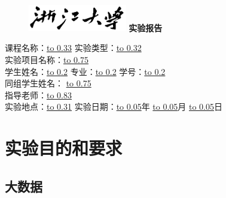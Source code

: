 \documentclass[UTF8,AutoFakeBold,a4paper]{article}%
\begin{document}
    \thispagestyle{empty}
    \begin{figure}[t]
        \centering
        \includegraphics[width=4.3cm]{figures/zju_subnote.png}
        \textbf{\bfseries\kaishu 实验报告}
    \end{figure}
    \parbox{0.9\linewidth}{
        \fangsong{}\linespread{1.5}
        课程名称：\underline{\hbox to 0.33\linewidth{\hfill 流体力学 \hfill}}
        实验类型：\underline{\hbox to 0.32\linewidth{\hfill 验证性 \hfill}} \\ 
        实验项目名称：\underline{\hbox to 0.75\linewidth{\hfill \hfill}} \\ 
        学生姓名：\underline{\hbox to 0.2\linewidth{\hfill \hfill}}
        专业：\underline{\hbox to 0.2\linewidth{\hfill \hfill}}
        学号：\underline{\hbox to 0.2\linewidth{\hfill \hfill}} \\ 
        同组学生姓名：	\underline{\hbox to 0.75\linewidth{\hfill \hfill}} \\ 		         		
        指导老师：\underline{\hbox to 0.83\linewidth{\hfill \hfill}} \\ 
        实验地点：\underline{\hbox to 0.31\linewidth{\hfill \hfill}}
        实验日期：\underline{\hbox to 0.05\linewidth{\hfill \hfill}}年
        \underline{\hbox to 0.05\linewidth{\hfill \hfill}}月
        \underline{\hbox to 0.05\linewidth{\hfill \hfill}}日
    }
    \section{实验目的和要求}
    \subsection{大数据}
\end{document}
